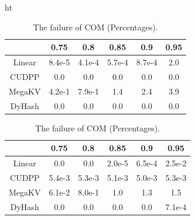 \begin{table}{ht}
\begin{minipage}{0.45\linewidth}
		\begin{tabular}{|c|c|c|c|c|c|}
			\hline
			& 0.75 & 0.8 & 0.85 & 0.9 & 0.95\\ \hline
			Linear &8.4e-5 & 4.1e-4 &5.7e-4  & 8.7e-4 & 2.0 \\ \hline
			CUDPP & 0.0 & 0.0 &0.0  & 0.0 & 0.0 \\ \hline
			MegaKV &4.2e-1 & 7.9e-1 &1.4  & 2.4 & 3.9 \\ \hline
			DyHash &0.0 & 0.0 &0.0  & 0.0 & 0.0 \\ \hline
		\end{tabular}
		\label{tab:fail:rand}
	\end{minipage}
	\begin{minipage}{0.45\linewidth}\centering
		\caption{The failure of COM (Percentages).}
		\begin{tabular}{|c|c|c|c|c|c|}
			\hline
			& 0.75 & 0.8 & 0.85 & 0.9 & 0.95\\ \hline
			Linear &0.0 & 0.0 &2.0e-5  & 6.5e-4 & 2.5e-2 \\ \hline
			CUDPP & 5.4e-3 & 5.3e-3 &5.1e-3  & 5.0e-3 & 5.3e-3 \\ \hline
			MegaKV &6.1e-2 & 8.0e-1 &1.0  & 1.3 & 1.5 \\ \hline
			DyHash &0.0 & 0.0 &0.0  & 0.0 & 7.1e-4 \\ \hline
		\end{tabular}
		\label{tab:fail:com}
	\end{minipage}
\end{table}
